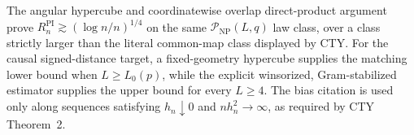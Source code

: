 The angular hypercube and coordinatewise overlap direct-product argument prove \(R_n^{\mathrm{PI}}\gtrsim(\log n/n)^{1/4}\) on the same \(\mathcal P_{\mathrm{NP}}(L,q)\) law class, over a class strictly larger than the literal common-map class displayed by CTY.  For the causal signed-distance target, a fixed-geometry hypercube supplies the matching lower bound when \(L\geq L_0(p)\), while the explicit winsorized, Gram-stabilized estimator supplies the upper bound for every \(L\geq4\).  The bias citation is used only along sequences satisfying \(h_n\downarrow0\) and \(nh_n^2\to\infty\), as required by CTY Theorem~2.